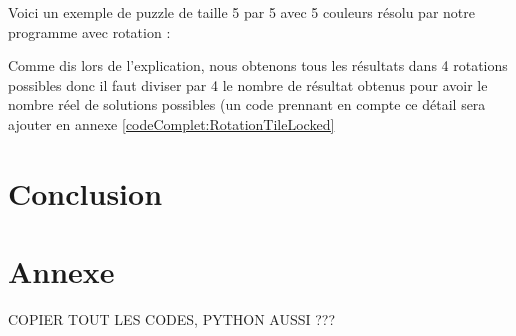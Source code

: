 \documentclass[french]{rapportAlgoM1}
\begin{document}
Voici un exemple de puzzle de taille 5 par 5 avec 5 couleurs résolu
par notre programme avec rotation :
\begin{verbnobox}\fontsize{7pt}{7pt}\selectfont
\end{verbnobox}
Comme dis lors de l'explication, nous obtenons tous les résultats dans 4 rotations possibles donc il faut diviser par 4 le nombre de résultat obtenus pour avoir le nombre réel de solutions possibles (un code prennant en compte ce détail sera ajouter en annexe \ref{codeComplet:RotationTileLocked}


\section*{Conclusion}

\section*{Annexe}



COPIER TOUT LES CODES, PYTHON AUSSI ???
\end{document}
